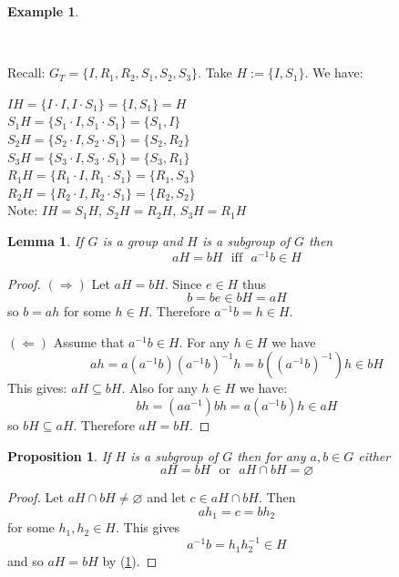 \documentclass[12pt, letterpaper, oneside]{article}
\theoremstyle{plain}
\newtheorem{lemma}[theorem]{Lemma}
\newtheorem{proposition}[theorem]{Proposition}
\theoremstyle{definition}
\newtheorem{example}[theorem]{Example}
\newcommand{\Ra}{\Rightarrow}
\newcommand{\La}{\Leftarrow}
\newcommand{\vs}{\vskip 5mm}
\begin{document}
\begin{example} \ 
\label{EX_COSET}

\vskip -10mm

\ 

Recall: $G_{T} = \{I, R_{1}, R_{2}, S_{1}, S_{2}, S_{3} \}$. 
Take $H := \{I, S_{1}\} $. We have:

$IH = \{I\cdot I, I\cdot S_{1}\} = \{I, S_{1}\} = H $ \\
$S_{1}H = \{ S_{1}\cdot I, S_{1}\cdot S_{1}\} = \{S_{1}, I\}$ \\
$S_{2}H = \{ S_{2}\cdot I, S_{2}\cdot S_{1}\} = \{S_{2}, R_{2}\}$ \\
$S_{3}H = \{ S_{3}\cdot I, S_{3}\cdot S_{1}\} = \{S_{3}, R_{1}\}$ \\
$R_{1}H = \{ R_{1}\cdot I, R_{1}\cdot S_{1}\} = \{R_{1}, S_{3}\}$ \\
$R_{2}H = \{ R_{2}\cdot I, R_{2}\cdot S_{1}\} = \{R_{2}, S_{2}\}$ \\


Note:  $IH = S_{1}H$, $S_{2}H = R_{2}H$, $S_{3}H = R_{1}H$

\end{example}

\vs

\begin{lemma}
\label{LEMMA_COSETS}
If $G$ is a group and $H$ is a subgroup of $G$ then 
$$aH = bH \ \ \ \text{iff} \ \ \ a^{-1}b \in H$$
\end{lemma}

\begin{proof}
$(\Ra)$ Let $aH = bH$. Since $e\in H$ thus 
$$b = be \in bH = aH$$
so $b = ah$ for some $h\in H$. Therefore $a^{-1}b = h \in H$.

\vs

$(\La)$ Assume that  $a^{-1}b\in H$. For any $h\in H$ we have 
$$ah = a(a^{-1}b)(a^{-1}b)^{-1}h  = b((a^{-1}b)^{-1})h \in bH$$
This gives: $aH \subseteq bH$. Also for any $h\in H$ we have:
$$bh = (aa^{-1})bh = a(a^{-1}b)h \in aH$$
so $bH\subseteq aH$. Therefore $aH= bH$.
\end{proof}


\vs 

\begin{proposition}
If $H$ is a subgroup of $G$ then for any  $a, b\in G$ either
$$aH = bH \ \ \ \text{or} \ \ \ aH\cap bH = \varnothing $$
\end{proposition}

\begin{proof}
Let $aH\cap bH \neq \varnothing $ and let $c\in aH\cap bH$. Then
$$ah_{1} =  c = bh_{2}$$
for some $h_{1}, h_{2}\in H$. This gives 
$$a^{-1}b = h_{1}h_{2}^{-1} \in H$$
and so $aH = bH$ by (\ref{LEMMA_COSETS}).
\end{proof}
\end{document}
